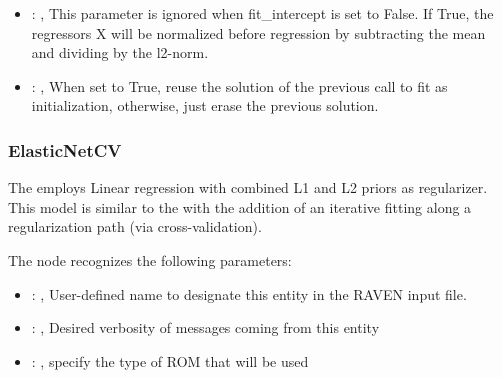 \begin{itemize}
    \item {}: , 
      This parameter is ignored when fit\_intercept is set to False. If True,
      the regressors X will be normalized before regression by subtracting the mean and
      dividing by the l2-norm.

    \item {}: , 
      When set to True, reuse the solution of the previous call
      to fit as initialization, otherwise, just erase the previous solution.
  \end{itemize}


\subsubsection{ElasticNetCV}
  The  employs                         Linear regression with combined L1 and
  L2 priors as regularizer.                         This model is similar to the
                           with the addition of an iterative fitting along a
  regularization path (via cross-validation).

  The  node recognizes the following parameters:
    \begin{itemize}
      \item {}: , 
        User-defined name to designate this entity in the RAVEN input file.
      \item {}: , 
        Desired verbosity of messages coming from this entity
      \item {}: , 
        specify the type of ROM that will be used
  \end{itemize}

